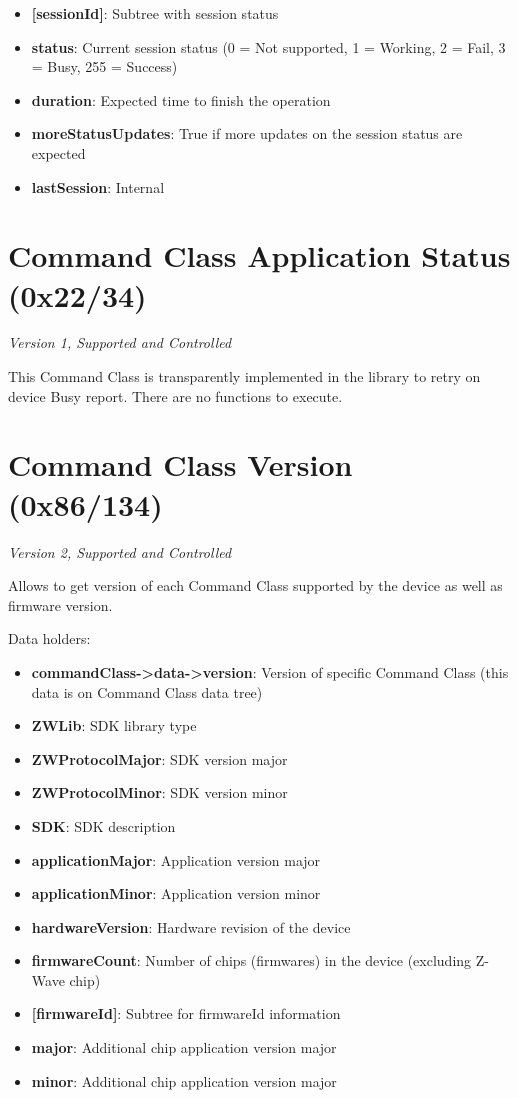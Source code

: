 \begin{itemize}
\item \textbf{[sessionId]}: Subtree with session status
\item \qquad\textbf{status}: Current session status (0 = Not supported, 1 = Working, 2 = Fail, 3 = Busy, 255 = Success)
\item \qquad\textbf{duration}: Expected time to finish the operation
\item \qquad\textbf{moreStatusUpdates}: True if more updates on the session status are expected
\item \textbf{lastSession}: Internal
\end{itemize}


\section{Command Class Application Status (0x22/34)}

\textit{Version 1, Supported and Controlled}
\newline

This Command Class is transparently implemented in the library to retry on device Busy report. There are no functions to execute.

\section{Command Class Version (0x86/134)}

\textit{Version 2, Supported and Controlled}
\newline

Allows to get version of each Command Class supported by the device as well as firmware version.
\newline

\noindent
Data holders:

\begin{itemize}
\item \textbf{commandClass->data->version}: Version of specific Command Class (this data is on Command Class data tree)
\item \textbf{ZWLib}: SDK library type
\item \textbf{ZWProtocolMajor}: SDK version major
\item \textbf{ZWProtocolMinor}: SDK version minor
\item \textbf{SDK}: SDK description
\item \textbf{applicationMajor}: Application version major
\item \textbf{applicationMinor}: Application version minor
\item \textbf{hardwareVersion}: Hardware revision of the device
\item \textbf{firmwareCount}: Number of chips (firmwares) in the device (excluding Z-Wave chip)
\item \textbf{[firmwareId]}: Subtree for firmwareId information
\item \qquad\textbf{major}: Additional chip application version major
\item \qquad\textbf{minor}: Additional chip application version major
\end{itemize}



